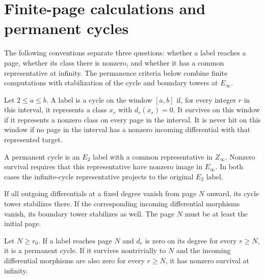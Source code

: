 \section{Finite-page calculations and permanent cycles}

The following conventions separate three questions: whether a label
reaches a page, whether its class there is nonzero, and whether it has
a common representative at infinity. The permanence criteria below combine finite computations with
stabilization of the cycle and boundary towers at $E_\infty$.

\begin{definition}
\label{sem:SpectralSequence:permanent}
Let $2\leq a\leq b$. A label is a cycle on the window $[a,b]$ if, for every integer $r$ in this interval, it represents a class $x_r$ with $d_r(x_r)=0$. It survives on this window if it represents a nonzero class on every page in the interval. It is never hit on this window if no page in the interval has a nonzero incoming differential with that represented target.

A permanent cycle is an $E_2$ label with a common representative in $Z_\infty$. Nonzero survival requires that this representative have nonzero image in $E_\infty$. In both cases the infinite-cycle representative projects to the original $E_2$ label.

If all outgoing differentials at a fixed degree vanish from page $N$ onward, its cycle tower stabilizes there. If the corresponding incoming differential morphisms vanish, its boundary tower stabilizes as well. The page $N$ must be at least the initial page.

Let $N\geq r_0$. If a label reaches page $N$ and $d_r$ is zero on its degree for every $r\geq N$, it is a permanent cycle. If it survives nontrivially to $N$ and the incoming differential morphisms are also zero for every $r\geq N$, it has nonzero survival at infinity.
\end{definition}


